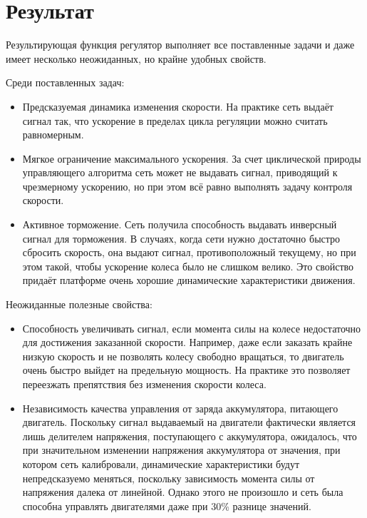 \documentclass[14pt]{extreport}
\begin{document}
        \section{Результат}
            Результирующая функция регулятор выполняет все поставленные задачи и даже имеет несколько неожиданных, но крайне удобных свойств.

            Среди поставленных задач:
                \begin{itemize}
                  \item Предсказуемая динамика изменения скорости. На практике сеть выдаёт сигнал так, что ускорение в пределах цикла регуляции можно считать равномерным.
                  \item Мягкое ограничение максимального ускорения. За счет циклической природы управляющего алгоритма сеть может не выдавать сигнал, приводящий к чрезмерному ускорению, но при этом всё равно выполнять задачу контроля скорости.
                  \item Активное торможение. Сеть получила способность выдавать инверсный сигнал для торможения. В случаях, когда сети нужно достаточно быстро сбросить скорость, она выдают сигнал, противоположный текущему, но при этом такой, чтобы ускорение колеса было не слишком велико. Это свойство придаёт платформе очень хорошие динамические характеристики движения.
                \end{itemize}
            Неожиданные полезные свойства:
                \begin{itemize}
                  \item Способность увеличивать сигнал, если момента силы на колесе недостаточно для достижения заказанной скорости. Например, даже если заказать крайне низкую скорость и не позволять колесу свободно вращаться, то двигатель очень быстро выйдет на предельную мощность. На практике это позволяет переезжать препятствия без изменения скорости колеса.
                  \item Независимость качества управления от заряда аккумулятора, питающего двигатель. Поскольку сигнал выдаваемый на двигатели фактически является лишь делителем напряжения, поступающего с аккумулятора, ожидалось, что при значительном изменении напряжения аккумулятора от значения, при котором сеть калибровали, динамические характеристики будут непредсказуемо меняться, поскольку зависимость момента силы от напряжения далека от линейной. Однако этого не произошло и сеть была способна управлять двигателями даже при 30\% разнице значений.
                \end{itemize}
\end{document}
